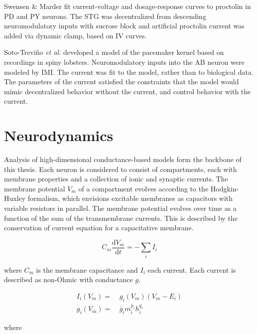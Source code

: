 Swensen \& Marder fit current-voltage and dosage-response curves to proctolin in \acs{PD} and \acs{PY} neurons\autocite{SwensenMultiplepeptidesconverge2000,SwensenModulatorsconvergentcellular2001}. The \acs{STG} was decentralized from descending neuromodulatory inputs with sucrose block and artificial proctolin current was added via dynamic clamp, based on IV curves.

Soto-Trevi\~no \textit{et al.} developed a model of the pacemaker kernel based on recordings in spiny lobsters\autocite{Soto-TrevinoComputationalmodelelectrically2005}. Neuromodulatory inputs into the AB neuron were modeled by \acs{IMI}. The current was fit to the model, rather than to biological data. The parameters of the current satisfied the constraints that the model would mimic decentralized behavior without the current, and control behavior with the current.

\FloatBarrier

\section{Neurodynamics}
Analysis of high-dimensional conductance-based models form the backbone of this thesis. Each neuron is considered to consist of compartments, each with membrane properties and a collection of ionic and synaptic currents\autocite{AbbottAnalysisNeuronModels1993,Liumodelneuronactivitydependent1998}. The membrane potential $V_m$ of a compartment evolves according to the Hodgkin-Huxley formalism, which envisions excitable membranes as capacitors with variable resistors in parallel\autocite{Hodgkincomponentsmembraneconductance1952}. The membrane potential evolves over time as a function of the sum of the transmembrane currents. This is described by the conservation of current equation for a capacitative membrane.

\begin{equation} \label{eq:voltage}
	C_m \frac{\mathrm{d}V_m}{\mathrm{d}t} = - \sum_i I_i
\end{equation}

where $C_m$ is the membrane capacitance and $I_i$ each current. Each current is described as non-Ohmic with conductance $g$.

\begin{align}
	I_i(V_m) =&\ g_i(V_m)(V_m-E_i) \\
	g_i(V_m) =&\ \bar{g}_i m_i^{p_i} h_i^{q_i}
\end{align}

where

